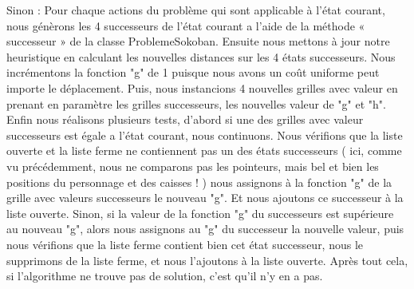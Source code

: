 \documentclass[a4paper,12pt]{article} %
\begin{document}
Sinon :
\newline\newline 
Pour chaque actions du problème qui sont applicable à l’état courant, nous génèrons les 4 successeurs de l’état courant a l’aide de la méthode « successeur » de la classe ProblemeSokoban. Ensuite nous mettons à jour notre heuristique en calculant les nouvelles distances sur les 4 états successeurs.
\newline\newline
Nous incrémentons la fonction "g" de 1 puisque nous avons un coût uniforme peut importe le déplacement.
\newline\newline
Puis, nous instancions 4 nouvelles grilles avec valeur en prenant en paramètre les grilles successeurs, les nouvelles valeur de  "g" et "h".
\newline\newline
Enfin nous réalisons plusieurs tests, d’abord si une des grilles avec valeur successeurs est égale a l’état courant, nous continuons. Nous vérifions que la liste ouverte et la liste ferme ne contiennent pas un des états successeurs ( ici, comme vu précédemment, nous ne comparons pas les pointeurs, mais bel et bien les positions du personnage et des caisses ! ) nous assignons à la fonction "g" de la grille avec valeurs successeurs le nouveau "g".
\newline\newline
Et nous ajoutons ce successeur à la liste ouverte.
\newline\newline
Sinon, si la valeur de la fonction "g" du successeurs est supérieure au nouveau "g", alors nous assignons au "g" du successeur la nouvelle valeur, puis nous vérifions que la liste ferme contient bien cet état successeur, nous le supprimons de la liste ferme, et nous l’ajoutons à la liste ouverte.
\newline\newline
Après tout cela, si l’algorithme ne trouve pas de solution, c’est qu’il n’y en a pas.
\newpage
\end{document}

